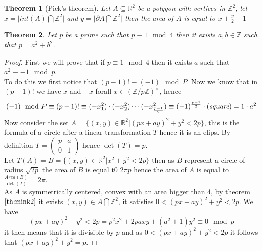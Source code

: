 \documentclass[a4paper,11pt,american]{article}
\newcommand{\R}{\mathbb{R}}
\newcommand{\Z}{\mathbb{Z}}
\theoremstyle{plain}
\newtheorem{theorem}{Theorem}
\theoremstyle{definition}
\begin{document}
\begin{theorem}[Pick's theorem]
    Let $A\subseteq \R^2$ be a polygon with vertices in $\Z^2$, let $x=\vert int(A)\bigcap \Z^2\vert$ and $y=\vert \partial A\bigcap \Z^2\vert$ then the area of $A$ is equal to $x+\frac{y}{2}-1$
\end{theorem}

\begin{theorem}
    Let $p$ be a prime such that $p\equiv 1\mod 4$ then it exists $a,b\in\Z$ such that $p=a^2+b^2$.
\end{theorem}
\begin{proof}
    First we will prove that if $p\equiv 1\mod 4$ then it exists $a$ such that $a^2\equiv -1 \mod p$.\\
    To do this we first notice that $(p-1)!\equiv (-1)\mod P$. Now 
    we know that in $(p-1)!$ we have $x$ and $-x$ forall $x\in (\Z/p\Z)^{\times}$, hence $$(-1)\mod P\equiv(p-1)!\equiv (-x_1^2)\cdot(-x_2^2)\cdots(-x^2_{\frac{p-1}{2}})\equiv (-1)^{\frac{p-1}{2}}\cdot(\emph{square})=1\cdot a^2$$
    Now consider the set $A=\{(x,y)\in\R^2\vert(px+ay)^2+y^2<2p\}$, this is the formula of a circle after a linear transformation $T$ hence it is an elips. By definition $T=\begin{pmatrix}
        p & a  \\
        0 & 1  
      \end{pmatrix} $ hence $\det(T)=p$.\\
      Let $T(A)=B=\{(x,y)\in\R^2\vert x^2+y^2<2p\}$ then as $B$ represent a circle of radius $\sqrt{2p}$ the area of $B$ is equal t0 $2\pi p$ hence the area of $A$ is equal to $\frac{Area(B)}{\det(T)}=2\pi$.\\
      As $A$ is symmetrically centered, convex with an area bigger than 4, by theorem $\eqref{th:mink2}$ it exists $(x,y)\in A\bigcap\Z^2$, it satisfies $0<(px+ay)^2+y^2<2p$.
      We have $$(px+ay)^2+y^2<2p=p^2x^2+2paxy+(a^2+1)y^2\equiv0\mod p$$ it then means that it is divisible by $p$ and as $0<(px+ay)^2+y^2<2p$ it follows that $(px+ay)^2+y^2=p$.
\end{proof}


\end{document}
